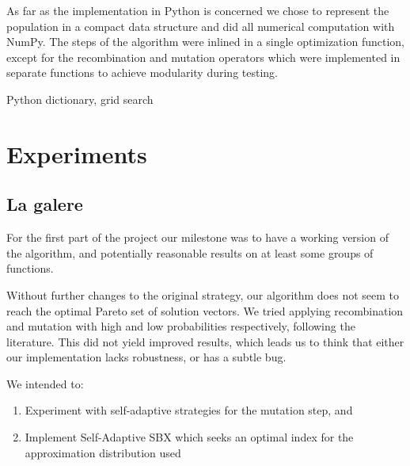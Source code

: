 \documentclass{sig-alternate}
\begin{document}
As far as the implementation in Python is concerned we chose to represent the population in a compact data structure and did all numerical computation with NumPy. The steps of the algorithm were inlined in a single optimization function, except for the recombination and mutation operators which were implemented in separate functions to achieve modularity during testing.

Python dictionary, grid search

\section{Experiments}
\subsection{La galere}
 For the first part of the project our milestone was to have a working version of the algorithm, and potentially reasonable results on at least some groups of functions.
 
Without further changes to the original strategy, our algorithm does not seem to reach the optimal Pareto set of solution vectors. We tried applying recombination and mutation with high and low probabilities respectively, following the literature. This did not yield improved results, which leads us to think that either our implementation lacks robustness, or has a subtle bug.

We intended to:
\begin{enumerate}
\item Experiment with self-adaptive strategies for the mutation step, and 
\item Implement Self-Adaptive SBX which seeks an optimal index for the approximation distribution used
\end{enumerate}
\end{document}

